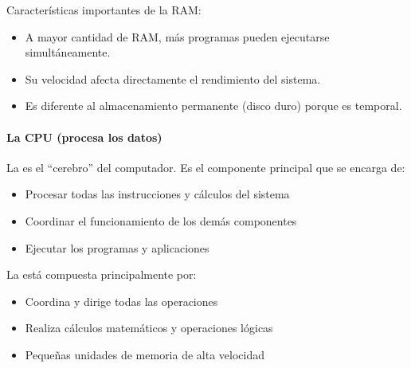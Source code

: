 \documentclass[letterpaper,10pt,spanish]{sphinxmanual}
\begin{document}
\sphinxAtStartPar
Características importantes de la RAM:
\begin{itemize}
\item {} 
\sphinxAtStartPar
A mayor cantidad de RAM, más programas pueden ejecutarse simultáneamente.

\item {} 
\sphinxAtStartPar
Su velocidad afecta directamente el rendimiento del sistema.

\item {} 
\sphinxAtStartPar
Es diferente al almacenamiento permanente (disco duro) porque es temporal.

\end{itemize}


\paragraph{La CPU (procesa los datos)}
\label{\detokenize{1_guias/10programacion/G1022:la-cpu-procesa-los-datos}}
\sphinxAtStartPar
La  es el “cerebro” del computador. Es el componente principal que se encarga de:
\begin{itemize}
\item {} 
\sphinxAtStartPar
Procesar todas las instrucciones y cálculos del sistema

\item {} 
\sphinxAtStartPar
Coordinar el funcionamiento de los demás componentes

\item {} 
\sphinxAtStartPar
Ejecutar los programas y aplicaciones

\end{itemize}

\sphinxAtStartPar
La  está compuesta principalmente por:
\begin{itemize}
\item {} 
\sphinxAtStartPar
{} Coordina y dirige todas las operaciones

\item {} 
\sphinxAtStartPar
{} Realiza cálculos matemáticos y operaciones lógicas

\item {} 
\sphinxAtStartPar
{} Pequeñas unidades de memoria de alta velocidad

\end{itemize}
\end{document}
